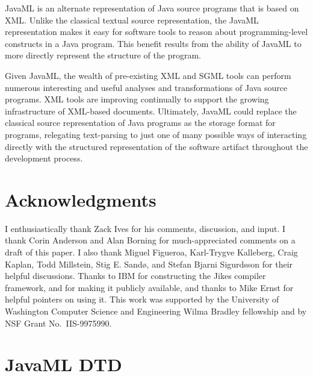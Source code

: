 \documentclass{article}
\begin{document}
\begin{multicols}{2}
JavaML is an alternate representation of Java source programs that is
based on XML.  Unlike the classical textual source representation, the
JavaML representation makes it easy for software tools to reason about
programming-level constructs in a Java program.  This benefit results from the
ability of JavaML to more directly represent the structure of the program.

Given JavaML, the wealth of pre-existing XML and SGML tools can perform
numerous interesting and useful analyses and transformations of Java
source programs.  XML tools are improving continually to support the
growing infrastructure of XML-based documents.  Ultimately, JavaML could
replace the classical source representation of Java programs as the
storage format for programs, relegating text-parsing to just one of many
possible ways of interacting directly with the structured representation
of the software artifact throughout the development process.

\section*{Acknowledgments}
\label{sec-ack}

I enthusiastically thank Zack Ives for his comments, discussion, and
input.  I thank Corin Anderson and Alan Borning for much-appreciated
comments on a draft of this paper.  I also thank Miguel Figueroa,
Karl-Trygve Kalleberg, Craig Kaplan, Todd Millstein, Stig E. Sand\o, and
Stefan Bjarni Sigurdsson for their helpful discussions. Thanks to IBM
for constructing the Jikes compiler framework, and for making it
publicly available, and thanks to Mike Ernst for helpful pointers on
using it. This work was supported by the University of Washington
Computer Science and Engineering Wilma Bradley fellowship and by NSF
Grant No.~IIS-9975990.

\appendix
\section{JavaML DTD}
\label{app-javaml-dtd}

{\small

}

{\small
}



\end{multicols}
\end{document}
